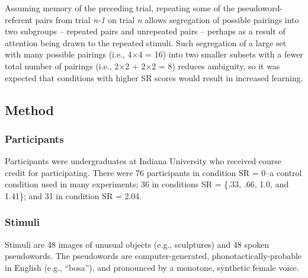 \documentclass[man,floatsintext]{apa6}
\begin{document}
Assuming memory of the preceding trial, repeating some of the pseudoword-referent pairs from trial \emph{n-1} on trial \emph{n} allows segregation of possible pairings into two subgroups -- repeated pairs and unrepeated pairs -- perhaps as a result of attention being drawn to the repeated stimuli.
Such segregation of a large set with many possible pairings (i.e., 4×4 = 16) into two smaller subsets with a fewer total number of pairings (i.e., 2×2 + 2×2 = 8) reduces ambiguity, so it was expected that conditions with higher SR scores would result in increased learning.

\hypertarget{method}{%
\subsection{Method}\label{method}}

\hypertarget{participants}{%
\subsubsection{Participants}\label{participants}}

Participants were undergraduates at Indiana University who received course credit for participating.
There were 76 participants in condition SR = 0--a control condition used in many experiments; 36 in conditions SR = \{.33, .66, 1.0, and 1.41\}; and 31 in condition SR = 2.04.

\hypertarget{stimuli}{%
\subsubsection{Stimuli}\label{stimuli}}

Stimuli are 48 images of unusual objects (e.g., sculptures) and 48 spoken pseudowords. The pseudowords are computer-generated, phonotactically-probable in English (e.g., \enquote{bosa}), and pronounced by a monotone, synthetic female voice.
\end{document}
